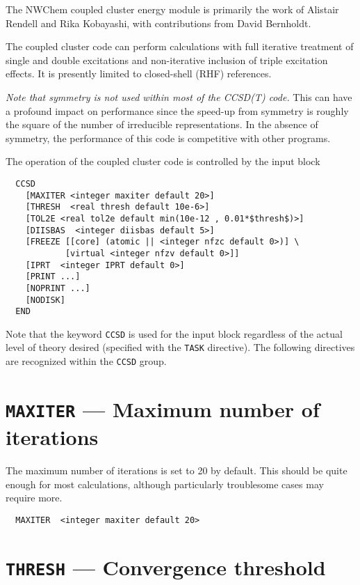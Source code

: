 %
%
\label{sec:ccsd}

The NWChem coupled cluster energy module is primarily the work of
Alistair Rendell and Rika Kobayashi, with contributions from David
Bernholdt.

The coupled cluster code can perform calculations with full iterative
treatment of single and double excitations and non-iterative inclusion
of triple excitation effects.  It is presently limited to closed-shell
(RHF) references.

{\em Note that symmetry is not used within most of the CCSD(T) code.}
This can have a profound impact on performance since the speed-up from
symmetry is roughly the square of the number of irreducible
representations.  In the absence of symmetry, the performance of this
code is competitive with other programs.

The operation of the coupled cluster code is controlled by the input
block
\begin{verbatim}
  CCSD
    [MAXITER <integer maxiter default 20>]
    [THRESH  <real thresh default 10e-6>]
    [TOL2E <real tol2e default min(10e-12 , 0.01*$thresh$)>]
    [DIISBAS  <integer diisbas default 5>]
    [FREEZE [[core] (atomic || <integer nfzc default 0>)] \
            [virtual <integer nfzv default 0>]]
    [IPRT  <integer IPRT default 0>]
    [PRINT ...]
    [NOPRINT ...]
    [NODISK]
  END
\end{verbatim}
Note that the keyword \verb+CCSD+ is used for the input block
regardless of the actual level of theory desired (specified with the
\verb+TASK+ directive).  The following directives are recognized
within the \verb+CCSD+ group.

\section{{\tt MAXITER} --- Maximum number of iterations}

The maximum number of iterations is set to 20 by default.  This should
be quite enough for most calculations, although particularly
troublesome cases may require more.

\begin{verbatim}
  MAXITER  <integer maxiter default 20>
\end{verbatim}

\section{{\tt THRESH} --- Convergence threshold}

